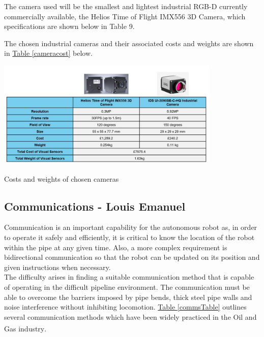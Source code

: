 \documentclass[11pt]{article}		%
\newcommand{\supercite}[1]{\textsuperscript{\cite{#1}}}		%
\newcommand{\tableref}[1]{\hyperref[#1]{Table \ref*{#1}}}     %
\begin{document}
	        The camera used will be the smallest and lightest industrial RGB-D currently commercially available, the Helios Time of Flight IMX556 3D Camera, which specifications are shown below in Table 9. 
	        
			The chosen industrial cameras and their associated costs and weights are shown in \tableref{cameracost} below.
				\begin{table}[H]
			  		\centering
			  		\includegraphics[width=0.8\textwidth]{cameracosts.jpg}
					\caption{Costs and weights of chosen cameras\supercite{camera}\supercite{camera2}}
					\label{cameracost}
				\end{table}
		
		\subsection[Communications]{Communications - Louis Emanuel}

			Communication is an important capability for the autonomous robot as, in order to operate it safely and efficiently, it is critical to know the location of the robot within the pipe at any given time. 
			Also, a more complex requirement is bidirectional communication so that the robot can be updated on its position and given instructions when necessary. 
			\\
		    The difficulty arises in finding a suitable communication method that is capable of operating in the difficult pipeline environment. 
		    The communication must be able to overcome the barriers imposed by pipe bends, thick steel pipe walls and noise interference without inhibiting locomotion.
		    \tableref{commsTable} outlines several communication methods which have been widely practiced in the Oil and Gas industry\supercite{acoustic2020}.
		    \\
		    
\end{document}
